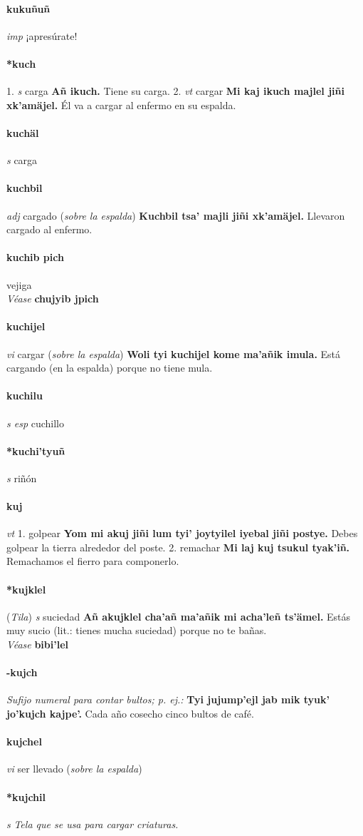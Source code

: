 \documentclass{scrbook}
\newcommand{\entry}[1]{\paragraph{#1}}
\newcommand{\onedefinition}[1]{#1.}
\newcommand{\nontranslationdef}[1]{\textit{#1}}
\newcommand{\partofspeech}[1]{\textit{#1}}
\newcommand{\spanishtranslation}[1]{#1}
\newcommand{\clarification}[1]{(\textit{#1})}
\newcommand{\cholexample}[1]{\textbf{#1}}
\newcommand{\exampletranslation}[1]{#1}
\newcommand{\alsosee}[1]{\\\textit{Véase} \textbf{#1}}
\newcommand{\relevantdialect}[1]{(\textit{#1})}
\begin{document}
\begin{multicols}{2}
\entry{kukuñuñ}
\partofspeech{imp}
\spanishtranslation{¡apresúrate!}

\entry{*kuch}
\onedefinition{1}
\partofspeech{s}
\spanishtranslation{carga}
\cholexample{Añ ikuch.}
\exampletranslation{Tiene su carga.}
\onedefinition{2}
\partofspeech{vt}
\spanishtranslation{cargar}
\cholexample{Mi kaj ikuch majlel jiñi xk'amäjel.}
\exampletranslation{Él va a cargar al enfermo en su espalda.}

\entry{kuchäl}
\partofspeech{s}
\spanishtranslation{carga}

\entry{kuchbil}
\partofspeech{adj}
\spanishtranslation{cargado}
\clarification{sobre la espalda}
\cholexample{Kuchbil tsa' majli jiñi xk'amäjel.}
\exampletranslation{Llevaron cargado al enfermo.}

\entry{kuchib pich}
\spanishtranslation{vejiga}
\alsosee{chujyib jpich}

\entry{kuchijel}
\partofspeech{vi}
\spanishtranslation{cargar}
\clarification{sobre la espalda}
\cholexample{Woli tyi kuchijel kome ma'añik imula.}
\exampletranslation{Está cargando (en la espalda) porque no tiene mula.}

\entry{kuchilu}
\partofspeech{s esp}
\spanishtranslation{cuchillo}

\entry{*kuchi'tyuñ}
\partofspeech{s}
\spanishtranslation{riñón}

\entry{kuj}
\partofspeech{vt}
\onedefinition{1}
\spanishtranslation{golpear}
\cholexample{Yom mi akuj jiñi lum tyi' joytyilel iyebal jiñi postye.}
\exampletranslation{Debes golpear la tierra alrededor del poste.}
\onedefinition{2}
\spanishtranslation{remachar}
\cholexample{Mi laj kuj tsukul tyak'iñ.}
\exampletranslation{Remachamos el fierro para componerlo.}

\entry{*kujklel}
\relevantdialect{Tila}
\partofspeech{s}
\spanishtranslation{suciedad}
\cholexample{Añ akujklel cha'añ ma'añik mi acha'leñ ts'ämel.}
\exampletranslation{Estás muy sucio (lit.: tienes mucha suciedad) porque no te bañas.}
\alsosee{bibi'lel}

\entry{-kujch}
\nontranslationdef{Sufijo numeral para contar bultos; p. ej.:}
\cholexample{Tyi jujump'ejl jab mik tyuk' jo'kujch kajpe'.}
\exampletranslation{Cada año cosecho cinco bultos de café.}

\entry{kujchel}
\partofspeech{vi}
\spanishtranslation{ser llevado}
\clarification{sobre la espalda}

\entry{*kujchil}
\partofspeech{s}
\nontranslationdef{Tela que se usa para cargar criaturas.}


\end{multicols}
\end{document}

